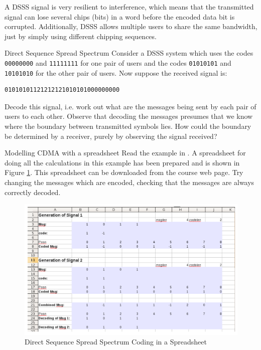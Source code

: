 A DSSS signal is very resilient to interference, which means that the transmitted signal can 
lose several chips (bits) in a word before the encoded data bit is corrupted. Additionally, DSSS allows
multiple users to share the same bandwidth, just by simply using different chipping sequences. 


\begin{exercise}{Direct Sequence Spread Spectrum}
Consider a DSSS system which uses the codes \verb|00000000| and \verb|11111111| for
one pair of users and the codes \verb|01010101| and \verb|10101010| for the other pair of users.
Now suppose the received signal is:
\begin{verbatim}
01010101121212121010101000000000
\end{verbatim}
Decode this signal, i.e. work out what are the messages being sent by each pair of users
to each other. Observe that decoding the messages presumes that we know where the
boundary between transmitted symbols lies. How could the boundary be determined
by a receiver, purely by observing the signal received?
\end{exercise}


\begin{sbexample}{Modelling CDMA with a spreadsheet}%
Read the example in \cite{cdmawiki}. A spreadsheet for doing all the
calculations in this example has been prepared and is shown in Figure
\ref{cdmaspread}. This spreadsheet can be downloaded from the course
web page. Try changing the messages which are encoded, checking that
the messages are always correctly decoded.

\begin{figure}
\begin{center}
\includegraphics[width=15 cm]{cdmaspreadsheet.png}
\caption{Direct Sequence Spread Spectrum Coding in a Spreadsheet}\label{cdmaspread}
\end{center}
\end{figure}
\end{sbexample}

